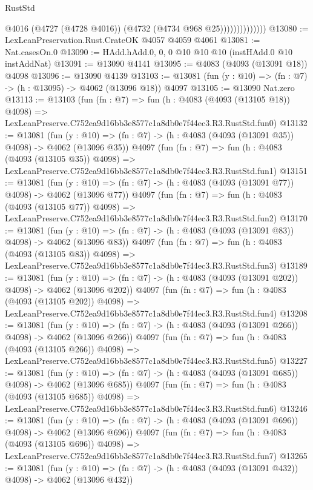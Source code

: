 \begin{lexlean}{RustStd}
\begin{coremodule}
                            @4016
                            (@4727 (@4728 @4016))
                            (@4732 (@4734 @968 @25))))))))))))))
@13080 := LexLeanPreservation.Rust.CrateOK @4057 @4059 @4061
@13081 := Nat.casesOn.{0}
@13090 := HAdd.hAdd.{0, 0, 0} @10 @10 @10 (instHAdd.{0} @10 instAddNat)
@13091 := @13090 @4141
@13095 := @4083 (@4093 (@13091 @18)) @4098
@13096 := @13090 @4139
@13103 := @13081 (fun (y : @10) => (fn : @7) -> (h : @13095) -> @4062 (@13096 @18)) @4097
@13105 := @13090 Nat.zero
@13113 := @13103
    (fun (fn : @7) =>
    fun (h : @4083 (@4093 (@13105 @18)) @4098) =>
    LexLeanPreserve.C752ea9d16bb3e8577c1a8db0e7f44ec3.R3.RustStd.fun0)
@13132 := @13081
    (fun (y : @10) => (fn : @7) -> (h : @4083 (@4093 (@13091 @35)) @4098) -> @4062 (@13096 @35))
    @4097
    (fun (fn : @7) =>
    fun (h : @4083 (@4093 (@13105 @35)) @4098) =>
    LexLeanPreserve.C752ea9d16bb3e8577c1a8db0e7f44ec3.R3.RustStd.fun1)
@13151 := @13081
    (fun (y : @10) => (fn : @7) -> (h : @4083 (@4093 (@13091 @77)) @4098) -> @4062 (@13096 @77))
    @4097
    (fun (fn : @7) =>
    fun (h : @4083 (@4093 (@13105 @77)) @4098) =>
    LexLeanPreserve.C752ea9d16bb3e8577c1a8db0e7f44ec3.R3.RustStd.fun2)
@13170 := @13081
    (fun (y : @10) => (fn : @7) -> (h : @4083 (@4093 (@13091 @83)) @4098) -> @4062 (@13096 @83))
    @4097
    (fun (fn : @7) =>
    fun (h : @4083 (@4093 (@13105 @83)) @4098) =>
    LexLeanPreserve.C752ea9d16bb3e8577c1a8db0e7f44ec3.R3.RustStd.fun3)
@13189 := @13081
    (fun (y : @10) => (fn : @7) -> (h : @4083 (@4093 (@13091 @202)) @4098) -> @4062 (@13096 @202))
    @4097
    (fun (fn : @7) =>
    fun (h : @4083 (@4093 (@13105 @202)) @4098) =>
    LexLeanPreserve.C752ea9d16bb3e8577c1a8db0e7f44ec3.R3.RustStd.fun4)
@13208 := @13081
    (fun (y : @10) => (fn : @7) -> (h : @4083 (@4093 (@13091 @266)) @4098) -> @4062 (@13096 @266))
    @4097
    (fun (fn : @7) =>
    fun (h : @4083 (@4093 (@13105 @266)) @4098) =>
    LexLeanPreserve.C752ea9d16bb3e8577c1a8db0e7f44ec3.R3.RustStd.fun5)
@13227 := @13081
    (fun (y : @10) => (fn : @7) -> (h : @4083 (@4093 (@13091 @685)) @4098) -> @4062 (@13096 @685))
    @4097
    (fun (fn : @7) =>
    fun (h : @4083 (@4093 (@13105 @685)) @4098) =>
    LexLeanPreserve.C752ea9d16bb3e8577c1a8db0e7f44ec3.R3.RustStd.fun6)
@13246 := @13081
    (fun (y : @10) => (fn : @7) -> (h : @4083 (@4093 (@13091 @696)) @4098) -> @4062 (@13096 @696))
    @4097
    (fun (fn : @7) =>
    fun (h : @4083 (@4093 (@13105 @696)) @4098) =>
    LexLeanPreserve.C752ea9d16bb3e8577c1a8db0e7f44ec3.R3.RustStd.fun7)
@13265 := @13081
    (fun (y : @10) => (fn : @7) -> (h : @4083 (@4093 (@13091 @432)) @4098) -> @4062 (@13096 @432))

\end{coremodule}
\end{lexlean}
